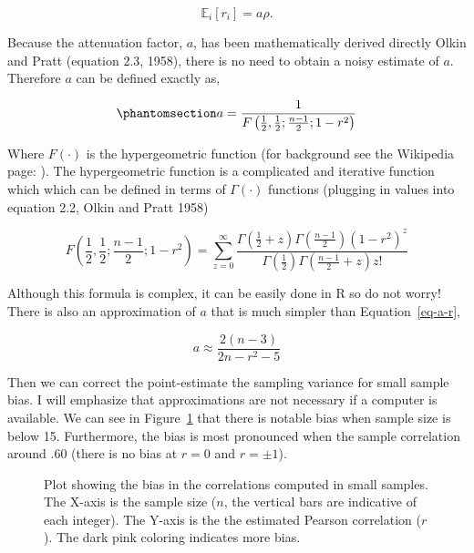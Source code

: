 \documentclass[
  letterpaper,
  DIV=11,
  numbers=noendperiod]{scrreprt}
\begin{document}
\[
\mathbb{E}_i[r_i] = a\rho.
\]

Because the attenuation factor, \(a\), has been mathematically derived
directly Olkin and Pratt (equation 2.3, 1958), there is no need to
obtain a noisy estimate of \(a\). Therefore \(a\) can be defined exactly
as,

\begin{equation}\phantomsection\label{eq-a-r}{
a = \frac{1}{F\left(\frac{1}{2},\frac{1}{2};\frac{n-1}{2};1-r^2\right)}
}\end{equation}

Where \(F(\cdot)\) is the hypergeometric function (for background see
the Wikipedia page: ). The hypergeometric function is a complicated and
iterative function which which can be defined in terms of
\(\Gamma(\cdot)\) functions (plugging in values into equation 2.2, Olkin
and Pratt 1958)

\[
F\left(\frac{1}{2},\frac{1}{2};\frac{n-1}{2};1-r^2\right) = \sum^{\infty}_{z=0} \frac{\Gamma\left(\frac{1}{2} + z\right)\Gamma\left(\frac{n-1}{2}\right)\left(1-r^2\right)^z}{\Gamma\left(\frac{1}{2}\right)\Gamma\left(\frac{n-1}{2}+z\right)z!}
\]

Although this formula is complex, it can be easily done in R so do not
worry! There is also an approximation of \(a\) that is much simpler than
Equation~\ref{eq-a-r},

\[
a \approx \frac{2(n-3)}{2n-r^2-5}
\]

Then we can correct the point-estimate the sampling variance for small
sample bias. I will emphasize that approximations are not necessary if a
computer is available. We can see in Figure~\ref{fig-r-bias} that there
is notable bias when sample size is below 15. Furthermore, the bias is
most pronounced when the sample correlation around .60 (there is no bias
at \(r=0\) and \(r=\pm 1\)).

\begin{figure}[H]


\caption{\label{fig-r-bias}Plot showing the bias in the correlations
computed in small samples. The X-axis is the sample size (\(n\), the
vertical bars are indicative of each integer). The Y-axis is the the
estimated Pearson correlation (\(r\)). The dark pink coloring indicates
more bias.}

\end{figure}%
\end{document}
